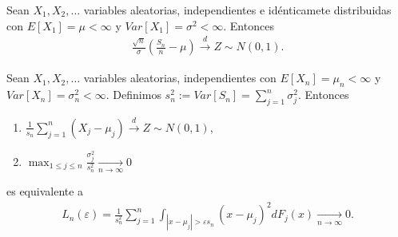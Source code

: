\begin{teo}
    Sean $X_1, X_2, \ldots$ variables aleatorias, independientes e idénticamete distribuidas con $E[X_1] = \mu < \infty$ y $Var[X_1] = \sigma^2 < \infty$. Entonces
    \begin{align*}
        \frac{\sqrt{n}}{\sigma} \left( \frac{S_n}{n} - \mu \right) \xrightarrow[\quad]{d} Z \sim N(0,1).
    \end{align*}
\end{teo}

\begin{teo}
    Sean $X_1, X_2, \ldots$ variables aleatorias, independientes con $E[X_n] = \mu_n < \infty$ y $Var[X_n] = \sigma^2_n < \infty$. Definimos $s_n^2 := Var[S_n] = \sum_{j=1}^{n} \sigma^2_j$. Entonces
    \begin{enumerate}
        \item $\frac{1}{s_n} \sum_{j=1}^{n} (X_j - \mu_j) \xrightarrow[\quad]{d} Z \sim N(0,1)$,
        \item $\max_{1 \leq j \leq n} \frac{\sigma^2_j}{s_n^2} \xrightarrow[n \to \infty]{} 0$
    \end{enumerate}
    es equivalente a
    \begin{align*}
        L_n(\varepsilon) = \frac{1}{s_n^2} \sum_{j=1}^{n} \int_{|x - \mu_j| > \varepsilon  s_n}(x-\mu_j)^2 dF_j(x) \xrightarrow[n \to \infty]{} 0.
    \end{align*}
\end{teo}